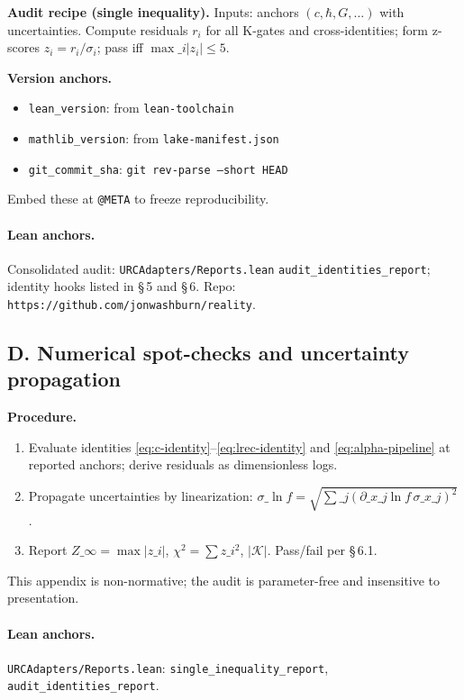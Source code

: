 \documentclass[11pt]{article}
\begin{document}
\textbf{Audit recipe (single inequality).}
Inputs: anchors \((c,\hbar,G,\dots)\) with uncertainties. Compute residuals \(r_i\) for all K\mbox{-}gates and cross\mbox{-}identities; form z\mbox{-}scores \(z_i=r_i/\sigma_i\); pass iff \(\max\_i|z_i|\le 5\).

\textbf{Version anchors.}
\begin{itemize}
  \item \texttt{lean\_version}: from \texttt{lean-toolchain}
  \item \texttt{mathlib\_version}: from \texttt{lake-manifest.json}
  \item \texttt{git\_commit\_sha}: \texttt{git rev-parse --short HEAD}
\end{itemize}
Embed these at \texttt{@META} to freeze reproducibility.

\paragraph{Lean anchors.} Consolidated audit: \texttt{URCAdapters/Reports.lean} \texttt{audit\_identities\_report}; identity hooks listed in \S\,5 and \S\,6. Repo: \texttt{https://github.com/jonwashburn/reality}.

\subsection*{D. Numerical spot\mbox{-}checks and uncertainty propagation}
\textbf{Procedure.}
\begin{enumerate}
  \item Evaluate identities \eqref{eq:c-identity}--\eqref{eq:lrec-identity} and \eqref{eq:alpha-pipeline} at reported anchors; derive residuals as dimensionless logs.
  \item Propagate uncertainties by linearization: \(\sigma\_{\ln f}=\sqrt{\sum\_j (\partial\_{x\_j}\ln f\,\sigma\_{x\_j})^2}\).
  \item Report \(Z\_\infty=\max|z\_i|\), \(\chi^2=\sum z\_i^2\), \(|\mathcal{K}|\). Pass/fail per \S\,6.1.
\end{enumerate}
This appendix is non\mbox{-}normative; the audit is parameter\mbox{-}free and insensitive to presentation.

\paragraph{Lean anchors.} \texttt{URCAdapters/Reports.lean}: \texttt{single\_inequality\_report}, \texttt{audit\_identities\_report}.
\end{document}
